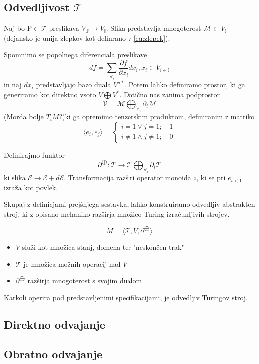 \documentclass{article}
\newcommand{\II}{\mathbb{I}}
\newcommand{\JJ}{\mathbb{J}}
\newcommand{\E}{\mathcal{E}}
\newcommand{\T}{\mathcal{T}}
\begin{document}
\subsection{Odvedljivost $\T$}
Naj bo $\mathrm{P}\subset\T$ preslikava $V_\JJ\to V_\II$. Slika predstavlja mnogoterost $\mathcal{M}\subset V_\II$ (dejansko je unija zlepkov kot definrano v \ref{eq:zlepek}).

Spomnimo se popolnega diferenciala preslikave
$$df=\sum_{\forall_i}\frac{\partial f}{\partial x_i}dx_i, x_i\in V_{i\in\II}$$
in naj $dx_i$ predstavljajo bazo duala $V^{n*}$. Potem lahko definiramo prostor, ki ga generiramo kot direktno vsoto $V\bigoplus V^*$. Dotično nas zanima podprostor
$$\mathcal{V}=\mathcal{M}\bigoplus_{\forall_i}\partial_i\mathcal{M}$$
(Morda bolje $T_iM$?)ki ga opremimo tenzorskim produktom, definiranim z matriko
$$\langle e_i, e_j\rangle =
  \begin{cases}
    i=1\lor j=1;\quad 1\\
    i\ne1\land j\ne 1;\quad 0
  \end{cases}$$
  
  Definirajmo funktor 
  $$\partial^{\bigoplus}:\T\to\T\bigoplus_{\forall_i}\partial_i\T$$
  ki slika $\E\to\E+d\E$. Transformacija razširi operator monoida $\circ$, ki se pri $e_{i<1}$ izraža kot povlek.
  
  Skupaj z definicjami prejšnjega sestavka, lahko konstruiramo odvedljiv abstrakten stroj, ki z opisano mehaniko razširja množico Turing izračunljivih strojev.
  
 $$M=\langle\T, V, \partial^{\bigoplus}\rangle$$
 \begin{itemize}
 \item
 $V$ služi kot množica stanj, domena ter "neskončen trak"
 \item
 $\T$ je množica možnih operacij nad $V$
 \item
 $\partial^{\bigoplus}$ razširja mnogoterost s svojim dualom 
 \end{itemize}
 
 Karkoli operira pod predstavljenimi specifikacijami, je odvedljiv Turingov stroj.
\subsection{Direktno odvajanje}
\subsection{Obratno odvajanje}
\end{document}
